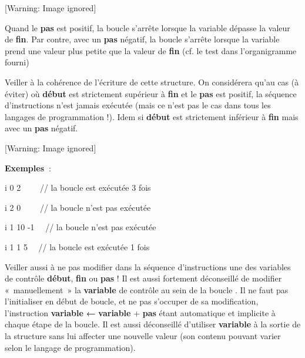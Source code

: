 \begin{center}
 [Warning: Image ignored] %

\end{center}
{
Quand le \textbf{pas} est positif, la boucle s'arrête
lorsque la variable dépasse la valeur de \textbf{fin}. Par contre, avec
un \textbf{pas} négatif, la boucle s'arrête lorsque la
variable prend une valeur plus petite que la valeur de \textbf{fin}
(cf. le test dans l'organigramme fourni)}

{
Veiller à la cohérence de l’écriture de cette structure. On considérera
qu’au cas (à éviter) où \textbf{début} est strictement supérieur à
\textbf{fin} et le \textbf{pas} est positif, la séquence d’instructions
n’est jamais exécutée (mais ce n’est pas le cas dans tous les langages
de programmation !). Idem si \textbf{début} est strictement inférieur à
\textbf{fin} mais avec un \textbf{pas} négatif.}

\begin{center}
 [Warning: Image ignored] %

\end{center}
{
\textbf{Exemples~}:}

{\sffamily
{} i  0  2
 \ \ \ \ // la boucle est exécutée 3 fois}

{\sffamily
{} i  2  0
 \ \ \ \ // la boucle n'est pas
exécutée}

{\sffamily
{} i  1  10
 -1  \ \ // la boucle
n'est pas exécutée}

{\sffamily
{} i  1  1
 5  \ \ // la boucle est
exécutée 1 fois}

{
Veiller aussi à ne pas modifier dans la séquence d’instructions une des
variables de contrôle \textbf{début}, \textbf{fin} ou \textbf{pas} ! Il
est aussi fortement déconseillé de modifier «~manuellement~» la
\textbf{variable} de contrôle au sein de la boucle
. Il ne faut pas l’initialiser en début de boucle,
et ne pas s’occuper de sa modification, l’instruction \textbf{variable}
{\textsf{\textbf{←}}} \textbf{variable} +
\textbf{pas} étant automatique et implicite à chaque étape de la
boucle. Il est aussi déconseillé d’utiliser \textbf{variable} à la
sortie de la structure  sans lui affecter une
nouvelle valeur (son contenu pouvant varier selon le langage de
programmation).}

